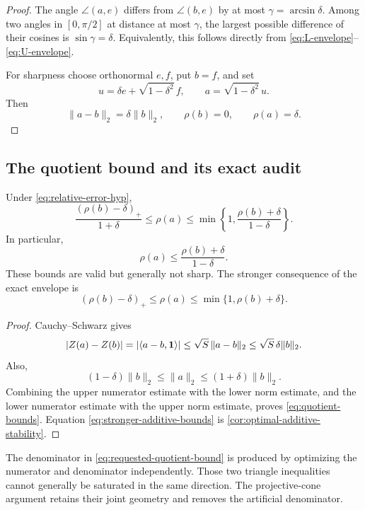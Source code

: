 \begin{proof}
The angle \(\angle(a,e)\) differs from
\(\angle(b,e)\) by at most \(\gamma=\arcsin\delta\).
Among two angles in \([0,\pi/2]\) at distance at most \(\gamma\),
the largest possible difference of their cosines is
\(\sin\gamma=\delta\).  Equivalently, this follows directly from
\eqref{eq:L-envelope}--\eqref{eq:U-envelope}.

For sharpness choose orthonormal \(e,f\), put \(b=f\), and set
\[
 u=\delta e+\sqrt{1-\delta^2}\,f,\qquad
 a=\sqrt{1-\delta^2}\,u.
\]
Then
\[
 \|a-b\|_2=\delta\|b\|_2,\qquad
 \rho(b)=0,\qquad
 \rho(a)=\delta.
\]
\end{proof}

\subsection{The quotient bound and its exact audit}

\begin{corollary}
\label{cor:quotient-bounds}
Under \eqref{eq:relative-error-hyp},
\begin{equation}
 \frac{(\rho(b)-\delta)_+}{1+\delta}
 \le\rho(a)\le
 \min\left\{
 1,\frac{\rho(b)+\delta}{1-\delta}
 \right\}.
\label{eq:quotient-bounds}
\end{equation}
In particular,
\begin{equation}
 \boxed{
 \rho(a)\le
 \frac{\rho(b)+\delta}{1-\delta}.}
\label{eq:requested-quotient-bound}
\end{equation}
These bounds are valid but generally not sharp.  The stronger
consequence of the exact envelope is
\begin{equation}
 (\rho(b)-\delta)_+\le\rho(a)
 \le\min\{1,\rho(b)+\delta\}.
\label{eq:stronger-additive-bounds}
\end{equation}
\end{corollary}

\begin{proof}
Cauchy--Schwarz gives
\[
 |Z(a)-Z(b)|
 =
 |\langle a-b,\mathbf 1\rangle|
 \le\sqrt S\,\|a-b\|_2
 \le\sqrt S\,\delta\|b\|_2.
\]
Also,
\[
 (1-\delta)\|b\|_2
 \le\|a\|_2
 \le(1+\delta)\|b\|_2.
\]
Combining the upper numerator estimate with the lower norm estimate,
and the lower numerator estimate with the upper norm estimate,
proves \eqref{eq:quotient-bounds}.  Equation
\eqref{eq:stronger-additive-bounds} is
\cref{cor:optimal-additive-stability}.
\end{proof}

\begin{remark}
The denominator in \eqref{eq:requested-quotient-bound} is produced
by optimizing the numerator and denominator independently.  Those
two triangle inequalities cannot generally be saturated in the
same direction.  The projective-cone argument retains their joint
geometry and removes the artificial denominator.
\end{remark}


